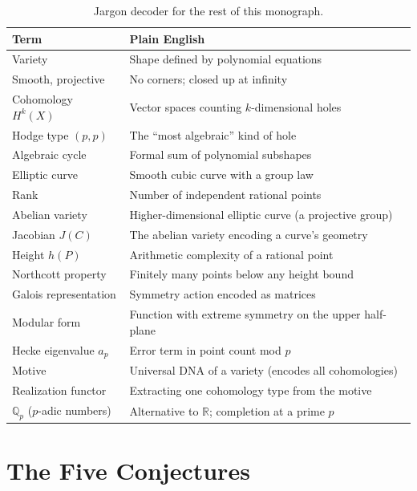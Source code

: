 \documentclass[11pt,twoside,openany]{report}
\theoremstyle{remark}
\begin{document}
\begin{table}[htbp]
\centering\small
\caption{Jargon decoder for the rest of this monograph.}
\renewcommand{\arraystretch}{1.25}
\begin{tabular}{@{}l p{6cm}@{}}
\toprule
\textbf{Term} & \textbf{Plain English} \\
\midrule
Variety & Shape defined by polynomial equations \\
Smooth, projective & No corners; closed up at infinity \\
Cohomology $H^k(X)$ & Vector spaces counting $k$-dimensional holes \\
Hodge type $(p,p)$ & The ``most algebraic'' kind of hole \\
Algebraic cycle & Formal sum of polynomial subshapes \\
Elliptic curve & Smooth cubic curve with a group law \\
Rank & Number of independent rational points \\
Abelian variety & Higher-dimensional elliptic curve (a projective group) \\
Jacobian $J(C)$ & The abelian variety encoding a curve's geometry \\
Height $h(P)$ & Arithmetic complexity of a rational point \\
Northcott property & Finitely many points below any height bound \\
Galois representation & Symmetry action encoded as matrices \\
Modular form & Function with extreme symmetry on the upper half-plane \\
Hecke eigenvalue $a_p$ & Error term in point count mod $p$ \\
Motive & Universal DNA of a variety (encodes all cohomologies) \\
Realization functor & Extracting one cohomology type from the motive \\
$\mathbb{Q}_p$ ($p$-adic numbers) & Alternative to $\mathbb{R}$; completion at a prime $p$ \\
\bottomrule
\end{tabular}
\label{tab:jargon}
\end{table}


\chapter{The Five Conjectures}
\end{document}
